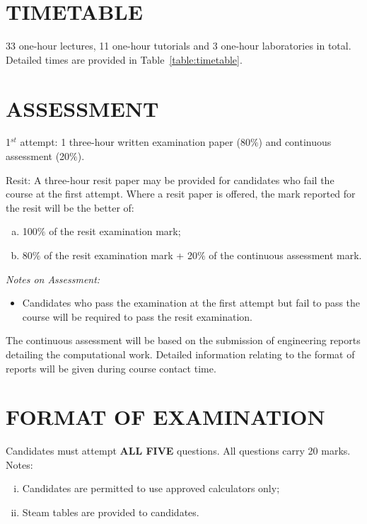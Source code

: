 \documentclass[12pts,a4paper,amsmath,amssymb,floatfix]{article}%
\begin{document}
\section{TIMETABLE}
33 one-hour lectures, 11 one-hour tutorials and 3 one-hour laboratories in total. Detailed times are provided in Table~\ref{table:timetable}.


\section{ASSESSMENT}
1$^{st}$ attempt: 1 three-hour written examination paper (80$\%$) and continuous assessment (20$\%$). 
\medskip

Resit: A three-hour resit paper may be provided for candidates who fail the course at the first attempt. Where a resit paper is offered, the mark reported for the resit will be the better of:
\begin{enumerate}[(a)]
  \item 100$\%$ of the resit examination mark;
  \item 80$\%$ of the resit examination mark + 20$\%$ of the continuous assessment mark.
\end{enumerate}
\medskip

{\it Notes on Assessment:
\begin{itemize}
\item Candidates who pass the examination at the first attempt but fail to pass the course will be required to pass the resit examination.
\end{itemize}}

\medskip

The continuous assessment will be based on the submission of engineering reports detailing the computational work. Detailed information relating to the format of reports will be given during course contact time.


\section{FORMAT OF EXAMINATION}
Candidates must attempt {\bf ALL FIVE} questions. All questions carry 20 marks. Notes:
\begin{enumerate}[(i)]
\item Candidates are permitted to use approved calculators only;
\item Steam  tables are provided to candidates.
\end{enumerate}
\end{document}
